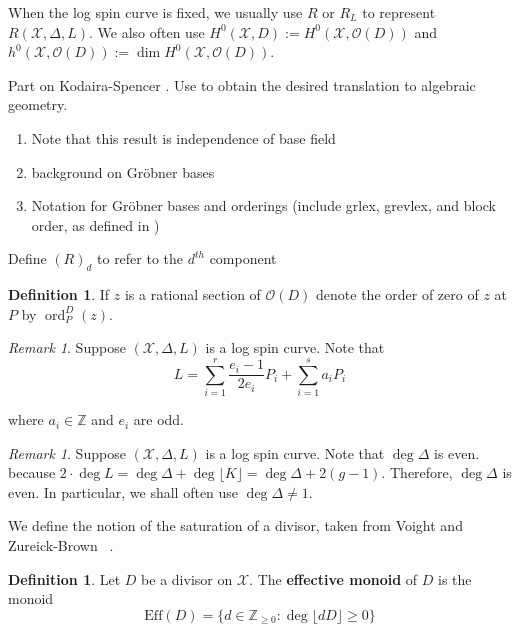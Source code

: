 \documentclass{amsart}
\theoremstyle{plain}
\theoremstyle{definition}
\newtheorem{defn}[thm]{Definition}
\theoremstyle{remark}
\newtheorem{rem}[thm]{Remark}
\numberwithin{equation}{section}
\newcommand\BZ{{\mathbb Z}}
\newcommand \sx{\mathscr X}
\newcommand\sco{{\mathscr O}}
\DeclareMathOperator{\ord}{ord}
\newcommand \halfcan{L}
\newcommand \Eff{\text{Eff}}
\begin{document}
\noindent
When the log spin curve is fixed, we usually use $R$ or $R_L$ to
represent $R(\sx, \Delta, \halfcan)$. We also often use $H^0(\sx, D)
:= H^0(\sx, \sco(D))$ and $h^0(\sx, \sco(D)) := \dim H^0(\sx, \sco(D))$.

Part on Kodaira-Spencer \cite{kodaira:complex-manifolds}.
Use \cite[Lemma 10.2.1]{vzb:stacky} to obtain the desired translation to algebraic 
geometry.


\begin{enumerate}
	\item Note that this result is independence of base field
	\item background on Gr\"{o}bner bases
	\item Notation for Gr\"{o}bner bases and orderings (include grlex, grevlex, and block order, as defined in \cite[Definition 8.1.1]{vzb:stacky})
\end{enumerate}

Define $(R)_d$ to refer to the $d^{th}$ component

\begin{defn}
\label{def:order-sup}
If $z$ is a rational section of $\sco(D)$ denote the order of
zero of $z$ at $P$ by $\ord_P^D(z)$.
\end{defn}


\begin{rem}
\label{rem:odd-denom}
Suppose $(\sx, \Delta, L)$ is a log spin curve. Note that
\[
	L = \sum_{i = 1}^{r} \frac{e_i - 1}{2e_i} P_i + \sum_{i = 1}^{s} a_i P_i
\]

\noindent
where $a_i \in \BZ$ and $e_i$ are odd.
\end{rem}
	
\begin{rem}
\label{rem:delta-not-1}
Suppose $(\sx,\Delta,L)$ is a log spin curve. Note that $\deg \Delta
$ is even. because $2 \cdot \deg L = \deg \Delta + \deg \lfloor K
\rfloor = \deg \Delta + 2(g-1).$ Therefore, $\deg \Delta$ is even.
In particular, we shall often use $\deg \Delta \neq 1$.
\end{rem}


We define the notion of the saturation of a divisor, taken from
Voight and Zureick-Brown ~\cite[Section 7.2]{vzb:stacky}.

\begin{defn}
Let $D$ be a divisor on $\sx$. The \textbf{effective monoid} of $D$
is the monoid
\[
	\Eff(D) = \{d \in \BZ_{\geq 0} : \deg \lfloor dD \rfloor \geq 0 \}
\]
\end{defn}
\end{document}
